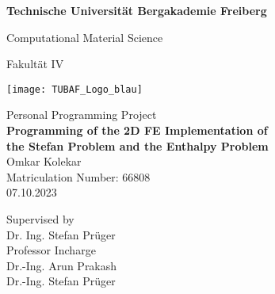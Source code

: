 \thispagestyle{empty}
\begin{center}

\vspace*{1.4cm}
{\LARGE \textbf{Technische Universität Bergakademie Freiberg}}

\vspace{0.5cm}

{\large Computational Material Science\\[1mm]}

Fakultät IV\\

\vspace*{1cm}

\texttt{[image: TUBAF\_Logo\_blau]}

\vspace*{1.0cm}

{\LARGE Personal Programming Project}\\

\vspace{1.0cm}
{\LARGE \textbf{Programming of the 2D FE Implementation of}}\\
\vspace*{0.3cm}
{\LARGE \textbf{ the Stefan Problem and the Enthalpy Problem}}\\
\vspace*{1.0cm}
{\LARGE Omkar Kolekar}
\\
\vspace*{0.5cm}
Matriculation Number: 66808\\
07.10.2023\\ %
\vspace*{1.0cm}

Supervised by\\
Dr. Ing. Stefan Prüger\\

\vspace*{0.5cm}
Professor Incharge\\
Dr.-Ing. Arun Prakash\\
Dr.-Ing. Stefan Prüger
\vspace{3cm}


\end{center}
